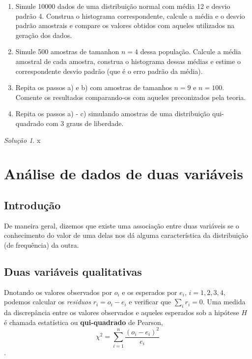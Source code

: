 \documentclass[
]{latex/krantz}
\providecommand{\tightlist}{%
  \setlength{\itemsep}{0pt}\setlength{\parskip}{0pt}}
\renewenvironment{quote}{\begin{VF}}{\end{VF}}
\theoremstyle{definition}
\theoremstyle{definition}
\theoremstyle{definition}
\theoremstyle{definition}
\theoremstyle{remark}
\newtheorem*{solution}{Solução}
\begin{document}
\begin{enumerate}
\def\labelenumi{\alph{enumi})}
\tightlist
\item
  Simule 10000 dados de uma distribuição normal com média 12 e desvio padrão 4. Construa o histograma correspondente, calcule a média e o desvio padrão amostrais e compare os valores obtidos com aqueles utilizados na geração dos dados.
\item
  Simule 500 amostras de tamanhon \(n = 4\) dessa população. Calcule a média amostral de cada amostra, construa o histograma dessas médias e estime o correspondente desvio padrão (que é o erro padrão da média).
\item
  Repita os passos a) e b) com amostras de tamanhos \(n = 9\) e \(n = 100\). Comente os resultados comparando-os com aqueles preconizados pela teoria.
\item
  Repita os passos a) - c) simulando amostras de uma distribuição qui-quadrado com 3 graus de liberdade.
\end{enumerate}

\begin{solution}
x
\end{solution}

\hypertarget{anuxe1lise-de-dados-de-duas-variuxe1veis}{%
\chapter{Análise de dados de duas variáveis}\label{anuxe1lise-de-dados-de-duas-variuxe1veis}}

\hypertarget{introduuxe7uxe3o-2}{%
\section{Introdução}\label{introduuxe7uxe3o-2}}

\begin{quote}
De maneira geral, dizemos que existe uma associação entre duas variáveis se o conhecimento do valor de uma delas nos dá alguma característica da distribuição (de frequência) da outra. \citep[p.~79]{MorettinSinger2022}
\end{quote}

\hypertarget{duas-variuxe1veis-qualitativas}{%
\section{Duas variáveis qualitativas}\label{duas-variuxe1veis-qualitativas}}

\begin{quote}
Dnotando os valores observados por \(o_i\) e os esperados por \(e_i\), \(i = 1, 2, 3, 4\), podemos calcular os \emph{residuos} \(r_i = o_i - e_i\) e verificar que \(\sum_i r_i = 0\). Uma medida da discrepância entre os valores observados e aqueles esperados sob a hipótese \(H\) é chamada estatística ou \textbf{qui-quadrado} de Pearson, \[\chi^2 = \sum\limits_{i = 1}^{n} \frac{(o_i - e_i)^2}{e_i}\] \citep[p.~82]{MorettinSinger2022}.
\end{quote}
\end{document}
